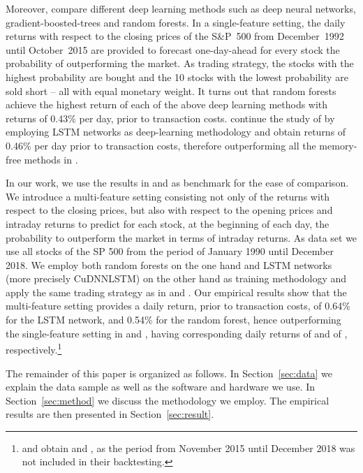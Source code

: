 \documentclass[review]{elsarticle}
\begin{document}
Moreover,
\cite{krauss17}  compare different deep learning methods such as deep neural networks, gradient-boosted-trees and random forests. In a single-feature setting, the daily returns with respect to the closing prices of the S\&P~500
 from December~1992 until October~2015 
are provided to forecast one-day-ahead for every stock the probability of outperforming the market. As trading strategy, the  stocks with the highest probability are bought and the 10 stocks with the lowest probability are sold short -- all with equal monetary weight.  It turns out that random forests achieve the highest return of each of the above deep learning methods with returns of 0.43\% per day, prior to transaction costs. \cite{krauss18} continue the study of \cite{krauss17} by employing LSTM networks as deep-learning  methodology and obtain returns of 0.46\% per day prior to transaction costs, therefore outperforming all the memory-free methods in \cite{krauss17}.

In our work, we use the results in \cite{krauss17} and \cite{krauss18} as benchmark for the ease of comparison. We introduce a multi-feature setting consisting not only of the returns with respect to the closing prices, but also with respect to the opening prices and intraday returns to predict for each stock, at the beginning of each day, the probability to outperform  the market in terms of intraday returns. As data set we use all stocks of the SP 500 from the period of January 1990 until December 2018.
We employ both random forests on the one hand and LSTM networks (more precisely CuDNNLSTM) on the other hand as training methodology and apply the same trading strategy as in  \cite{krauss17} and \cite{krauss18}. Our empirical results show that the multi-feature setting provides a daily return, prior to transaction costs, of 0.64\% for the LSTM network, and 0.54\% for the random forest, hence outperforming the single-feature setting in \cite{krauss18} and \cite{krauss17}, having corresponding daily returns of   and of , respectively.\footnote{\cite{krauss18} and  \cite{krauss17} obtain  and , as the period from November 2015 until December 2018 was not included in their backtesting.}

The  remainder of this paper is organized as follows. 
In Section~\ref{sec:data} we explain the data sample as well as the software and  hardware we use. In Section~\ref{sec:method} we discuss the methodology we employ. The empirical results are then presented
in Section~\ref{sec:result}.
\end{document}

